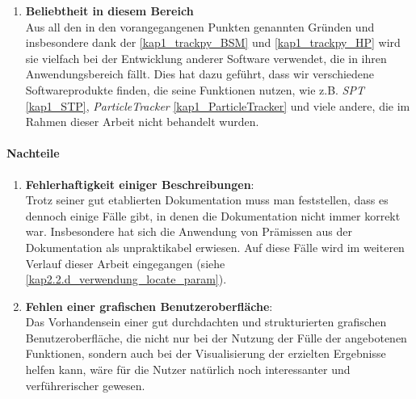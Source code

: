 \begin{enumerate}
    			\item \textbf{Beliebtheit in diesem Bereich}\\
    			Aus all den in den vorangegangenen Punkten genannten Gründen und insbesondere dank der \ref{kap1_trackpy_BSM} und \ref{kap1_trackpy_HP} wird sie vielfach bei der Entwicklung anderer Software verwendet, die in ihren Anwendungsbereich fällt. Dies hat dazu geführt, dass wir verschiedene Softwareprodukte finden, die seine Funktionen nutzen, wie z.B. \textit{SPT} \ref{kap1_STP},  \textit{ParticleTracker} \ref{kap1_ParticleTracker} und viele andere, die im Rahmen dieser Arbeit nicht behandelt wurden.
    			
		\end{enumerate}
		
	\paragraph{Nachteile}
		\begin{enumerate}
				\item \textbf{Fehlerhaftigkeit einiger Beschreibungen}:\\				
				Trotz seiner gut etablierten Dokumentation muss man feststellen, dass es dennoch einige Fälle gibt, in denen die Dokumentation nicht immer korrekt war. Insbesondere hat sich die Anwendung von Prämissen aus der Dokumentation als unpraktikabel erwiesen. Auf diese Fälle wird im weiteren Verlauf dieser Arbeit eingegangen (siehe \ref{kap2.2.d_verwendung_locate_param}).   
				    			
    			\item \textbf{Fehlen einer grafischen Benutzeroberfläche}:\\
    			Das Vorhandensein einer gut durchdachten und strukturierten grafischen Benutzeroberfläche, die nicht nur bei der Nutzung der Fülle der angebotenen Funktionen, sondern auch bei der Visualisierung der erzielten Ergebnisse helfen kann, wäre für die Nutzer natürlich noch interessanter und verführerischer gewesen.
		\end{enumerate}
		
